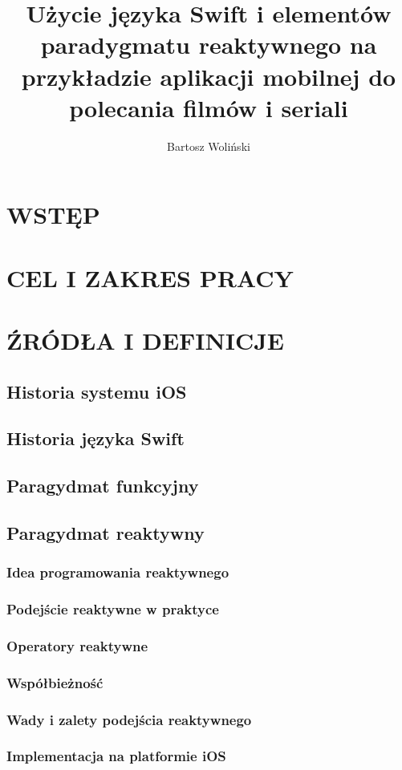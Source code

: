 \documentclass[]{report}
\title{Użycie języka Swift i elementów paradygmatu reaktywnego na przykładzie aplikacji mobilnej do polecania filmów i seriali}
\author{Bartosz Woliński}
\begin{document}
\maketitle
\tableofcontents
\chapter{WSTĘP}
\chapter{CEL I ZAKRES PRACY}
\chapter{ŹRÓDŁA I DEFINICJE}
\section{Historia systemu iOS}
\section{Historia języka Swift}
\section{Paragydmat funkcyjny}
\section{Paragydmat reaktywny}
\subsection{Idea programowania reaktywnego}
\subsection{Podejście reaktywne w praktyce}
\subsection{Operatory reaktywne}
\subsection{Współbieżność}
\subsection{Wady i zalety podejścia reaktywnego} 
\subsection{Implementacja na platformie iOS}
\end{document}
